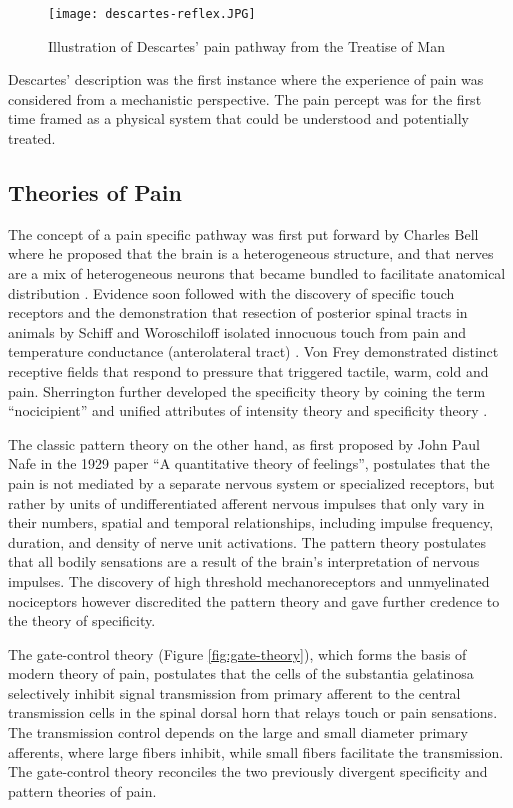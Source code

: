 \begin{figure}[ht]
\texttt{[image: descartes-reflex.JPG]}
\centering
\caption{Illustration of Descartes' pain pathway from the Treatise of Man \protect\cite{descartes-wikipedia}}
\label{fig:descarte}
\end{figure}

Descartes' description was the first instance where the experience of pain was considered from a mechanistic perspective. The pain percept was for the first time framed as a physical system that could be understood and potentially treated.

\subsection{Theories of Pain}
 
The concept of a pain specific pathway was first put forward by Charles Bell where he proposed that the brain is a heterogeneous structure, and that nerves are a mix of heterogeneous neurons that became bundled to facilitate anatomical distribution \cite{Bell1868}. Evidence soon followed with the discovery of specific touch receptors and the demonstration that resection of posterior spinal tracts in animals by Schiff and Woroschiloff isolated innocuous touch from pain and temperature conductance (anterolateral tract) \cite{Dallenbach1939}. Von Frey demonstrated distinct receptive fields that respond to pressure that triggered tactile, warm, cold and pain. Sherrington further developed the specificity theory by coining the term “nocicipient” and unified attributes of intensity theory and specificity theory \cite{Casey1982}.

The classic pattern theory on the other hand, as first proposed by John Paul Nafe in the 1929 paper “A quantitative theory of feelings”\cite{Nafe1929}, postulates that the pain is not mediated by a separate nervous system or specialized receptors, but rather by units of undifferentiated afferent nervous impulses that only vary in their numbers, spatial and temporal relationships, including impulse frequency, duration, and density of nerve unit activations. The pattern theory postulates that all bodily sensations are a result of the brain's interpretation of nervous impulses. The discovery of high threshold mechanoreceptors and unmyelinated nociceptors however discredited the pattern theory and gave further credence to the theory of specificity. 

The gate-control theory \cite{Melzack1965a} (Figure \ref{fig:gate-theory}), which forms the basis of modern theory of pain, postulates that the cells of the substantia gelatinosa selectively inhibit signal transmission from primary afferent to the central transmission cells in the spinal dorsal horn that relays touch or pain sensations. The transmission control depends on the large and small diameter primary afferents, where large fibers inhibit, while small fibers facilitate the transmission. The gate-control theory reconciles the two previously divergent specificity and pattern theories of pain.

